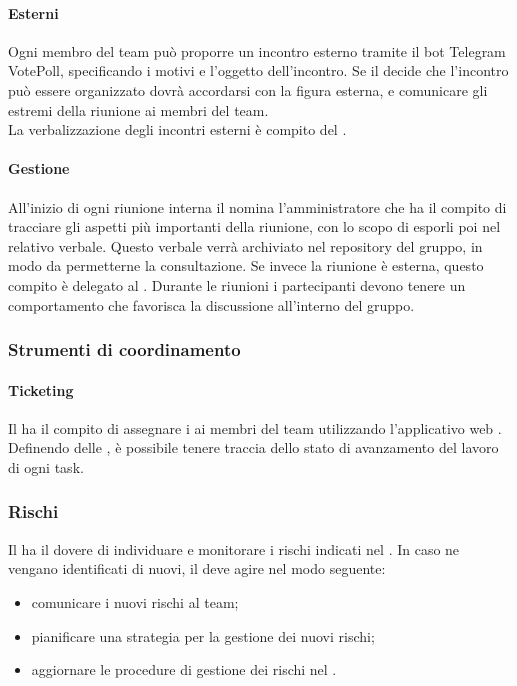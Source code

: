  \paragraph{Esterni} 
 Ogni membro del team può proporre un incontro esterno tramite il bot Telegram VotePoll, specificando i motivi e l'oggetto dell'incontro. 
Se il \RESP{} decide che l'incontro può essere organizzato dovrà accordarsi con la figura esterna, e comunicare gli estremi della riunione ai membri del team.\\
 La verbalizzazione degli incontri esterni è compito del \RESP.
 \paragraph{Gestione}
 All’inizio di ogni riunione interna il \RESP{} nomina l'amministratore che ha il compito di tracciare gli aspetti più importanti della riunione, con lo scopo di esporli poi nel relativo verbale. Questo verbale verrà archiviato nel repository del gruppo, in modo da permetterne la consultazione. Se invece la riunione è esterna, questo compito è delegato al \RESP{}.
 Durante le riunioni i partecipanti devono tenere un comportamento che favorisca la discussione all’interno del gruppo.
 
\subsubsection{Strumenti di coordinamento}
 \paragraph{Ticketing}
 Il \RESP{} ha il compito di assegnare i  ai membri del team utilizzando l'applicativo web . \\
 Definendo delle , è possibile tenere traccia dello stato di avanzamento del lavoro di ogni task.
 
 \subsubsection{Rischi}
 Il \RESP{} ha il dovere di individuare e monitorare i rischi indicati nel \PPdoc. In caso ne vengano identificati di nuovi, il \RESP{} deve agire nel modo seguente:
 \begin{itemize}
  \item comunicare i nuovi rischi al team;
  \item pianificare una strategia per la gestione dei nuovi rischi;
  \item aggiornare le procedure di gestione dei rischi nel \PPdoc.
 \end{itemize}
